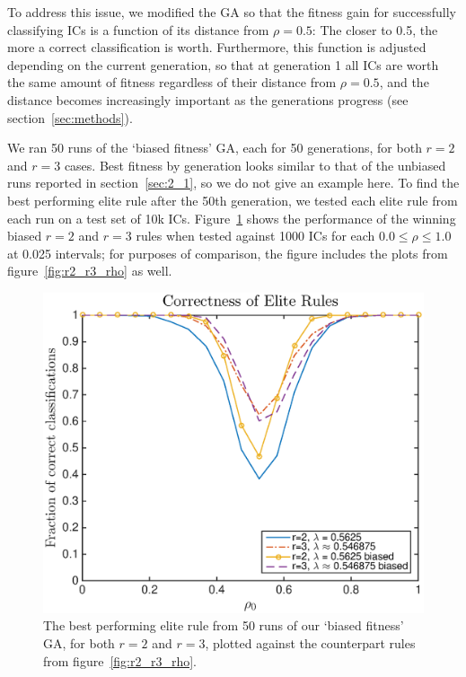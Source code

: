 To address this issue, we modified the GA so that the fitness gain for successfully classifying ICs is a function of its distance from $\rho = 0.5$: The 
closer to 0.5, the more a correct classification is worth. Furthermore, this function is adjusted depending on the current generation, so that at generation 1 
all ICs are worth the same amount of fitness regardless of their distance from $\rho = 0.5$, and the distance becomes increasingly important as 
the generations progress (see section~\ref{sec:methods}).

We ran 50 runs of the `biased fitness' GA, each for 50 generations, for both $r = 2$ and $r = 3$ cases. Best fitness by generation looks similar to that 
of the unbiased runs reported in section~\ref{sec:2_1}, so we do not give an example here. To find the best performing elite rule after the 
50th generation, we tested each elite rule from each run on a test set of 10k ICs. Figure~\ref{fig:r2_r3_rho_biased} shows the performance 
of the winning biased $r = 2$ and $r = 3$ rules when tested against 1000 ICs for each $0.0 \leq \rho \leq 1.0$ at 0.025 intervals; for purposes of 
comparison, the figure includes the plots from figure~\ref{fig:r2_r3_rho} as well.

\begin{figure}
\begin{center}
\includegraphics[width=\linewidth]{figures/lambda_biased_correctness_plot.eps}
\caption{The best performing elite rule from 50 runs of our `biased fitness' GA, for both $r = 2$ and $r = 3$, plotted against the counterpart rules from 
figure~\ref{fig:r2_r3_rho}.}
\label{fig:r2_r3_rho_biased}
\end{center}
\end{figure}


